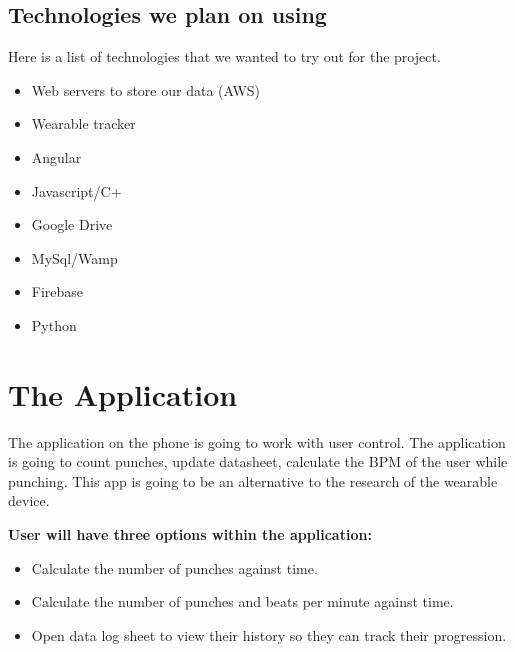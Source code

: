 \documentclass[a4paper,12pt]{report}
\begin{document}
\subsection{Technologies we plan on using}
Here is a list of technologies that we wanted to try out for the project.
\begin{itemize}
\item{Web servers to store our data (AWS)}
\item{Wearable tracker}
\item{Angular}
\item{Javascript/C+}
\item{Google Drive}
\item{MySql/Wamp}
\item{Firebase}
\item{Python}
\end{itemize}
\section{The Application}
The application on the phone is going to work with user control. The application is going to count punches, update datasheet, calculate the BPM of the user while punching. This app is going to be an alternative to the research of the wearable device.

\textbf{User will have three options within the application:}
\begin{itemize}
\item Calculate the number of punches against time.
\item Calculate the number of punches and beats per minute against time.
\item Open data log sheet to view their history so they can track their progression.
\end{itemize}
\end{document}
